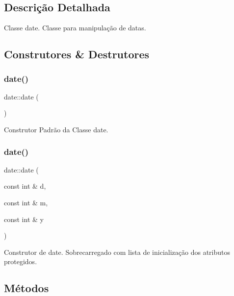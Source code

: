 \subsection{Descrição Detalhada}
Classe date. Classe para manipulação de datas. 

\subsection{Construtores \& Destrutores}
\mbox{\label{classdate_ace1e9bd1562330f4d03a385ee0cc2eba}} 
\subsubsection{\texorpdfstring{date()}{date()}\hspace{0.1cm}{\footnotesize\ttfamily [1/2]}}
{\footnotesize\ttfamily date\+::date (\begin{DoxyParamCaption}{ }\end{DoxyParamCaption})}

Construtor Padrão da Classe date. \mbox{\label{classdate_a9954370dd412bd9b521697d1ff18dd92}} 
\subsubsection{\texorpdfstring{date()}{date()}\hspace{0.1cm}{\footnotesize\ttfamily [2/2]}}
{\footnotesize\ttfamily date\+::date (\begin{DoxyParamCaption}\item[{const int \&}]{d,  }\item[{const int \&}]{m,  }\item[{const int \&}]{y }\end{DoxyParamCaption})}

Construtor de date. Sobrecarregado com lista de inicialização dos atributos protegidos. 

\subsection{Métodos}
\mbox{\label{classdate_aba8e450097ac4393f0a2c4987891309a}} 
